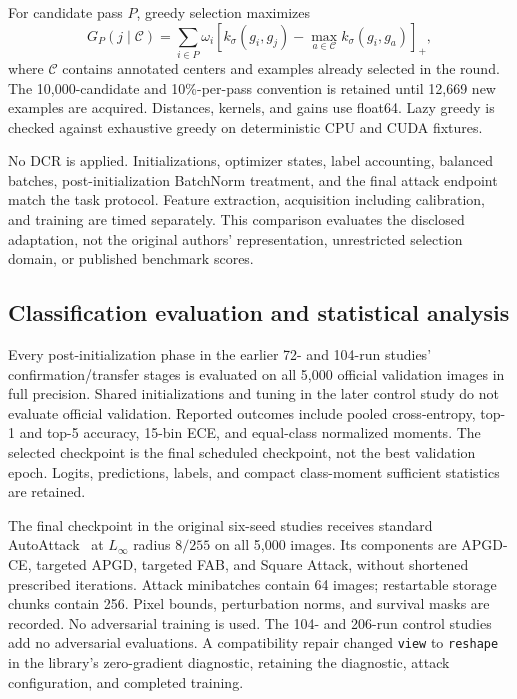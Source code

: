 \documentclass[10pt,a4paper,twocolumn]{article}
\begin{document}
For candidate pass $P$, greedy selection maximizes
\begin{equation}
 G_P(j\mid\mathcal C)=
 \sum_{i\in P}\omega_i
 \left[
 k_\sigma(g_i,g_j)-
 \max_{a\in\mathcal C}k_\sigma(g_i,g_a)
 \right]_+,
 \label{eq:uherding_gain}
\end{equation}
where $\mathcal C$ contains annotated centers and examples
already selected in the round.
The 10,000-candidate and 10\%-per-pass convention is retained
until 12,669 new examples are acquired.
Distances, kernels, and gains use float64.
Lazy greedy is checked against exhaustive greedy on
deterministic CPU and CUDA fixtures.

No DCR is applied. Initializations, optimizer states, label
accounting, balanced batches, post-initialization BatchNorm
treatment, and the final attack endpoint match the task protocol.
Feature extraction, acquisition including calibration, and
training are timed separately.
This comparison evaluates the disclosed adaptation, not the
original authors' representation, unrestricted selection domain,
or published benchmark scores.

\subsection{Classification evaluation and statistical analysis}
\label{sec:statistics}

Every post-initialization phase in the earlier 72- and 104-run studies'
confirmation/transfer stages is evaluated on all 5,000 official
validation images in full precision. Shared initializations and tuning
in the later control study do not evaluate official validation.
Reported outcomes include pooled cross-entropy, top-1 and top-5
accuracy, 15-bin ECE, and equal-class normalized moments.
The selected checkpoint is the final scheduled checkpoint,
not the best validation epoch.
Logits, predictions, labels, and compact class-moment sufficient
statistics are retained.

The final checkpoint in the original six-seed studies receives standard
AutoAttack~\cite{croce2020autoattack} at $L_\infty$ radius $8/255$
on all 5,000 images.
Its components are APGD-CE, targeted APGD, targeted FAB,
and Square Attack, without shortened prescribed iterations.
Attack minibatches contain 64 images; restartable storage chunks
contain 256. Pixel bounds, perturbation norms, and survival masks
are recorded. No adversarial training is used.
The 104- and 206-run control studies add no adversarial evaluations.
A compatibility repair changed \texttt{view} to \texttt{reshape}
in the library's zero-gradient diagnostic, retaining the diagnostic,
attack configuration, and completed training.
\end{document}
